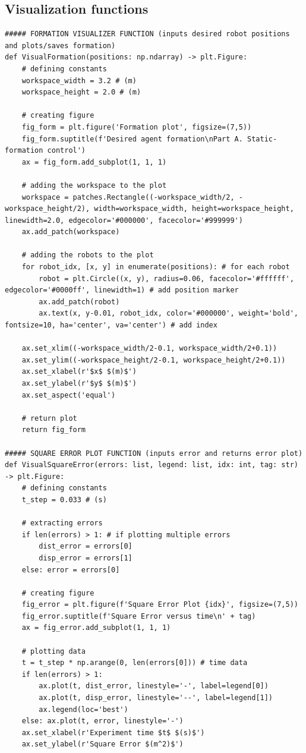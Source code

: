 \documentclass[11pt]{article}
\begin{document}
\subsection{Visualization functions}
\begin{verbatim}
##### FORMATION VISUALIZER FUNCTION (inputs desired robot positions and plots/saves formation)
def VisualFormation(positions: np.ndarray) -> plt.Figure:
    # defining constants
    workspace_width = 3.2 # (m)
    workspace_height = 2.0 # (m)

    # creating figure
    fig_form = plt.figure('Formation plot', figsize=(7,5))
    fig_form.suptitle(f'Desired agent formation\nPart A. Static-formation control')
    ax = fig_form.add_subplot(1, 1, 1)

    # adding the workspace to the plot
    workspace = patches.Rectangle((-workspace_width/2, -workspace_height/2), width=workspace_width, height=workspace_height, linewidth=2.0, edgecolor='#000000', facecolor='#999999')
    ax.add_patch(workspace)

    # adding the robots to the plot
    for robot_idx, [x, y] in enumerate(positions): # for each robot
        robot = plt.Circle((x, y), radius=0.06, facecolor='#ffffff', edgecolor='#0000ff', linewidth=1) # add position marker
        ax.add_patch(robot)
        ax.text(x, y-0.01, robot_idx, color='#000000', weight='bold', fontsize=10, ha='center', va='center') # add index

    ax.set_xlim((-workspace_width/2-0.1, workspace_width/2+0.1))
    ax.set_ylim((-workspace_height/2-0.1, workspace_height/2+0.1))
    ax.set_xlabel(r'$x$ $(m)$')
    ax.set_ylabel(r'$y$ $(m)$')
    ax.set_aspect('equal')

    # return plot
    return fig_form

##### SQUARE ERROR PLOT FUNCTION (inputs error and returns error plot)
def VisualSquareError(errors: list, legend: list, idx: int, tag: str) -> plt.Figure:
    # defining constants
    t_step = 0.033 # (s)

    # extracting errors
    if len(errors) > 1: # if plotting multiple errors
        dist_error = errors[0]
        disp_error = errors[1]
    else: error = errors[0]

    # creating figure
    fig_error = plt.figure(f'Square Error Plot {idx}', figsize=(7,5))
    fig_error.suptitle(f'Square Error versus time\n' + tag)
    ax = fig_error.add_subplot(1, 1, 1)

    # plotting data
    t = t_step * np.arange(0, len(errors[0])) # time data
    if len(errors) > 1:
        ax.plot(t, dist_error, linestyle='-', label=legend[0])
        ax.plot(t, disp_error, linestyle='--', label=legend[1])
        ax.legend(loc='best')
    else: ax.plot(t, error, linestyle='-')
    ax.set_xlabel(r'Experiment time $t$ $(s)$')
    ax.set_ylabel(r'Square Error $(m^2)$')


\end{verbatim}
\end{document}
